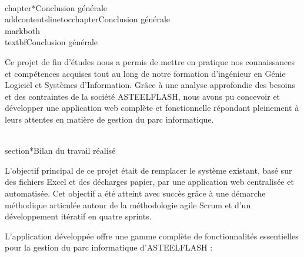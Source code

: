 \\chapter*{Conclusion générale}
\\addcontentsline{toc}{chapter}{Conclusion générale}
\\markboth{\\textbf{Conclusion générale}}{}

Ce projet de fin d'études nous a permis de mettre en pratique nos connaissances et compétences acquises tout au long de notre formation d'ingénieur en Génie Logiciel et Systèmes d'Information. Grâce à une analyse approfondie des besoins et des contraintes de la société ASTEELFLASH, nous avons pu concevoir et développer une application web complète et fonctionnelle répondant pleinement à leurs attentes en matière de gestion du parc informatique.

\\section*{Bilan du travail réalisé}

L'objectif principal de ce projet était de remplacer le système existant, basé sur des fichiers Excel et des décharges papier, par une application web centralisée et automatisée. Cet objectif a été atteint avec succès grâce à une démarche méthodique articulée autour de la méthodologie agile Scrum et d'un développement itératif en quatre sprints.

L'application développée offre une gamme complète de fonctionnalités essentielles pour la gestion du parc informatique d'ASTEELFLASH :

